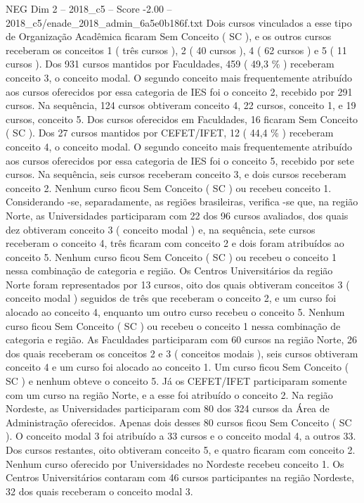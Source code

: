 \begin{textsample}{NEG Dim 2 – 2018\_c5 – Score -2.00 – 2018\_c5/enade\_2018\_admin\_6a5e0b186f.txt}
Dois cursos vinculados a esse tipo de Organização Acadêmica ficaram Sem Conceito ( SC ), e os outros cursos receberam os conceitos 1 ( três cursos ), 2 ( 40 cursos ), 4 ( 62 cursos ) e 5 ( 11 cursos ).
Dos 931 cursos mantidos por Faculdades, 459 ( 49,3 \% ) receberam conceito 3, o conceito modal.
O segundo conceito mais frequentemente atribuído aos cursos oferecidos por essa categoria de IES foi o conceito 2, recebido por 291 cursos.
Na sequência, 124 cursos obtiveram conceito 4, 22 cursos, conceito 1, e 19 cursos, conceito 5.
Dos cursos oferecidos em Faculdades, 16 ficaram Sem Conceito ( SC ).
Dos 27 cursos mantidos por CEFET/IFET, 12 ( 44,4 \% ) receberam conceito 4, o conceito modal.
O segundo conceito mais frequentemente atribuído aos cursos oferecidos por essa categoria de IES foi o conceito 5, recebido por sete cursos.
Na sequência, seis cursos receberam conceito 3, e dois cursos receberam conceito 2.
Nenhum curso ficou Sem Conceito ( SC ) ou recebeu conceito 1.
Considerando -se, separadamente, as regiões brasileiras, verifica -se que, na região Norte, as Universidades participaram com 22 dos 96 cursos avaliados, dos quais dez obtiveram conceito 3 ( conceito modal ) e, na sequência, sete cursos receberam o conceito 4, três ficaram com conceito 2 e dois foram atribuídos ao conceito 5.
Nenhum curso ficou Sem Conceito ( SC ) ou recebeu o conceito 1 nessa combinação de categoria e região.
Os Centros Universitários da região Norte foram representados por 13 cursos, oito dos quais obtiveram conceitos 3 ( conceito modal ) seguidos de três que receberam o conceito 2, e um curso foi alocado ao conceito 4, enquanto um outro curso recebeu o conceito 5.
Nenhum curso ficou Sem Conceito ( SC ) ou recebeu o conceito 1 nessa combinação de categoria e região.
As Faculdades participaram com 60 cursos na região Norte, 26 dos quais receberam os conceitos 2 e 3 ( conceitos modais ), seis cursos obtiveram conceito 4 e um curso foi alocado ao conceito 1.
Um curso ficou Sem Conceito ( SC ) e nenhum obteve o conceito 5.
Já os CEFET/IFET participaram somente com um curso na região Norte, e a esse foi atribuído o conceito 2.
Na região Nordeste, as Universidades participaram com 80 dos 324 cursos da Área de Administração oferecidos.
Apenas dois desses 80 cursos ficou Sem Conceito ( SC ).
O conceito modal 3 foi atribuído a 33 cursos e o conceito modal 4, a outros 33.
Dos cursos restantes, oito obtiveram conceito 5, e quatro ficaram com conceito 2.
Nenhum curso oferecido por Universidades no Nordeste recebeu conceito 1.
Os Centros Universitários contaram com 46 cursos participantes na região Nordeste, 32 dos quais receberam o conceito modal 3.

\end{textsample}
